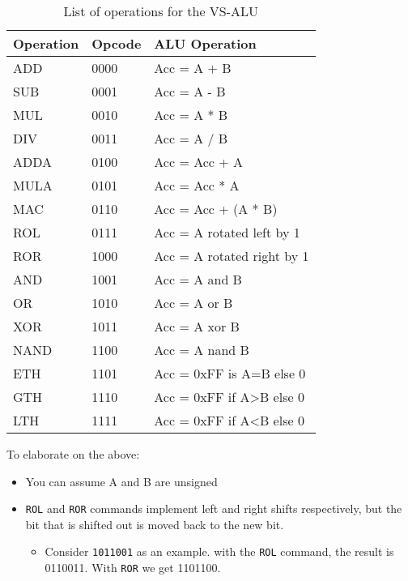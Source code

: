 \begin{table}[H]
\centering
\caption{List of operations for the VS-ALU}
\label{tbl:VSALUOP}
\begin{tabular}{|l|l|l|}
\hline
\textbf{Operation} & \textbf{Opcode} & \textbf{ALU Operation}               \\ \hline
ADD                & 0000            & Acc = A + B                          \\ \hline
SUB                & 0001            & Acc = A - B                          \\ \hline
MUL                & 0010            & Acc = A * B                          \\ \hline
DIV                & 0011            & Acc = A / B                          \\ \hline
ADDA               & 0100            & Acc = Acc + A                        \\ \hline
MULA               & 0101            & Acc = Acc * A                        \\ \hline
MAC                & 0110            & Acc = Acc + (A * B)                  \\ \hline
ROL                & 0111            & Acc = A rotated left by 1            \\ \hline
ROR                & 1000            & Acc = A rotated right by 1           \\ \hline
AND                & 1001            & Acc = A and B                        \\ \hline
OR                 & 1010            & Acc = A or B                         \\ \hline
XOR                & 1011            & Acc = A xor B                        \\ \hline
NAND               & 1100            & Acc = A nand B                       \\ \hline
ETH                & 1101             & Acc = 0xFF is A=B else 0             \\ \hline
GTH                & 1110            & Acc = 0xFF if A\textgreater{}B else 0\\ \hline
LTH                & 1111            & Acc = 0xFF if A\textless{}B else 0   \\ \hline
\end{tabular}%
\end{table}

To elaborate on the above:
\begin{itemize}
    \item You can assume A and B are unsigned
    \item \verb|ROL| and \verb|ROR| commands implement left and right shifts respectively, but the bit that is shifted out is moved back to the new bit.
    \begin{itemize}
        \item Consider \verb|1011001| as an example. with the \verb|ROL| command, the result is 0110011. With \verb|ROR| we get 1101100.
    \end{itemize}
\end{itemize}


